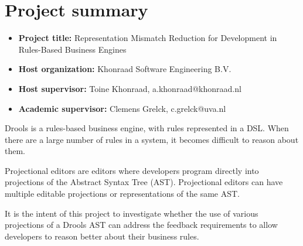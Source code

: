 \section{Project summary}

\begin{itemize}
    \item \textbf{Project title:} Representation Mismatch Reduction for Development in Rules-Based Business Engines
    \item \textbf{Host organization:} Khonraad Software Engineering B.V. 
    \item \textbf{Host supervisor:} Toine Khonraad, a.khonraad@khonraad.nl
    \item \textbf{Academic supervisor:} Clemens Grelck, c.grelck@uva.nl
\end{itemize}

Drools is a rules-based business engine, with rules represented in a DSL.
When there are a large number of rules in a system, it becomes difficult to reason about them.

Projectional editors are editors where developers program directly into projections of the Abstract Syntax Tree (AST).
Projectional editors can have multiple editable projections or representations of the same AST.

It is the intent of this project to investigate whether the use of various projections of a Drools AST can address the feedback requirements to allow developers to reason better about their business rules.